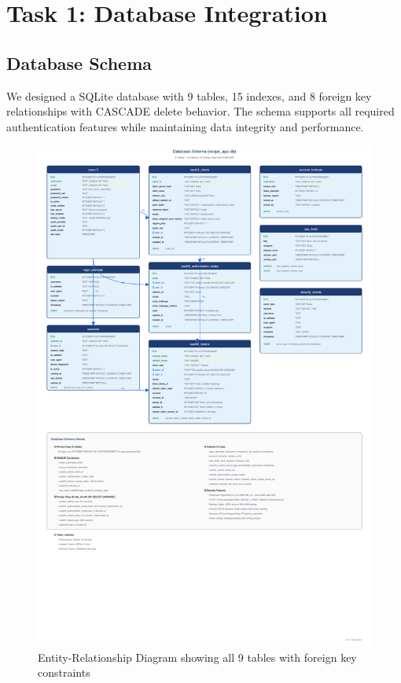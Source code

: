 \documentclass[12pt,a4paper]{article}
\begin{document}
\section{Task 1: Database Integration}

\subsection{Database Schema}

We designed a SQLite database with 9 tables, 15 indexes, and 8 foreign key relationships with CASCADE delete behavior. The schema supports all required authentication features while maintaining data integrity and performance.

\begin{figure}[H]
    \centering
    \includegraphics[width=\textwidth]{diagrams/4_database_er.png}
    \caption{Entity-Relationship Diagram showing all 9 tables with foreign key constraints}
    \label{fig:database}
\end{figure}
\end{document}
